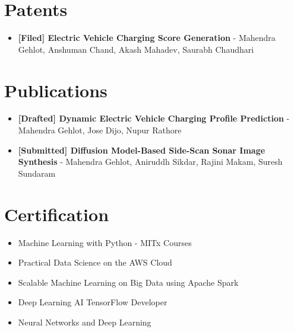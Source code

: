 \documentclass[letterpaper,11pt]{article}
\newcommand{\resumeItem}[1]{
  \item\small{
    {#1 \vspace{-2pt}}
  }
}
\newcommand{\resumeItemListStart}{\begin{itemize}}
\newcommand{\resumeItemListEnd}{\end{itemize}\vspace{-5pt}}
\begin{document}
\section{Patents}
\resumeItemListStart
\resumeItem{\textbf{[Filed] Electric Vehicle Charging Score Generation} - Mahendra Gehlot, Anshuman Chand, Akash Mahadev, Saurabh Chaudhari}
\resumeItemListEnd

\section{Publications}
\resumeItemListStart
\resumeItem{\textbf{[Drafted] Dynamic Electric Vehicle Charging Profile Prediction} - Mahendra Gehlot, Jose Dijo, Nupur Rathore}
\resumeItem{\textbf{[Submitted] Diffusion Model-Based Side-Scan Sonar Image Synthesis} - Mahendra Gehlot, Aniruddh Sikdar, Rajini Makam, Suresh Sundaram}
\resumeItemListEnd

\section{Certification}
    \begin{multicols}{2}
            \begin{itemize}[itemsep=-5pt, parsep=8pt]
                \item Machine Learning with Python - MITx Courses
                \item Practical Data Science on the AWS Cloud
                \item Scalable Machine Learning on Big Data using Apache Spark
                \item Deep Learning AI TensorFlow Developer
                \item Neural Networks and Deep Learning  
            \end{itemize}
        \end{multicols}
        \vspace*{2.0\multicolsep}
\end{document}
